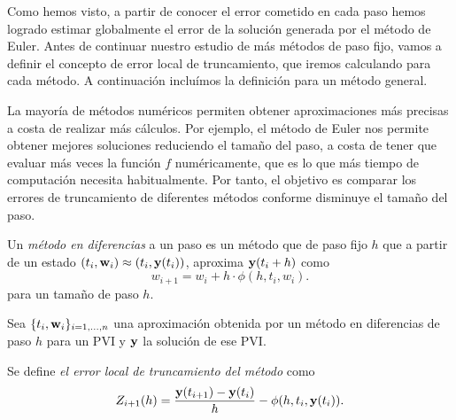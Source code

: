 Como hemos visto, a partir de conocer el error cometido en cada paso
hemos logrado estimar globalmente
el error de la solución generada por el método de Euler.
Antes de continuar nuestro estudio de más métodos de paso fijo,
vamos a definir el concepto de error local de truncamiento,
que iremos calculando para cada método.
A continuación incluímos la definición para un método general.



La mayoría de métodos numéricos permiten obtener aproximaciones más precisas
a costa de realizar más cálculos.
Por ejemplo, el método de Euler nos permite
obtener mejores soluciones reduciendo el tamaño del paso,
a costa de tener que evaluar más veces la función $f$ numéricamente,
que es lo que más tiempo de computación necesita habitualmente.
Por tanto, el objetivo es
comparar los errores de truncamiento de diferentes métodos
conforme disminuye el tamaño del paso.

\begin{definition}
    Un \emph{método en diferencias} a un paso es un método que de paso fijo $h$
    que a partir de un estado $(t_i, \vb{w}_i) \approx (t_i, \vb{y}(t_i))$,
    aproxima $\vb{y}(t_i + h)$ como
    \begin{equation*}
        w_{i+1} = w_i + h\cdot \phi(h, t_i, w_i).
    \end{equation*}
    para un tamaño de paso $h$.
\end{definition}

\begin{definition}
    Sea $\{t_i, \vb{w}_i\}_{i = 1,\ldots,n}$ una aproximación obtenida por
    un método en diferencias de paso $h$ para un PVI
    y $\vb{y}$ la solución de ese PVI.

    Se define \emph{el error local de truncamiento del método} como
    \begin{equation*}
        Z_{i+1}(h) = \frac{\vb{y}(t_{i+1}) - \vb{y}(t_i)}{h} - \phi(h, t_i, \vb{y}(t_i)).
    \end{equation*}
\end{definition}

